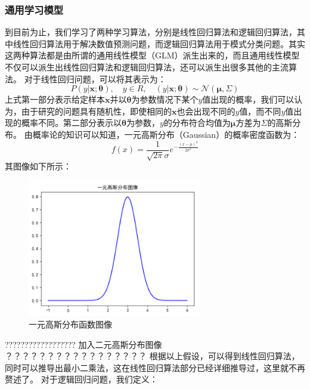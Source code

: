 \documentclass[UTF8]{article}
\begin{document}
\subsubsection{通用学习模型}
到目前为止，我们学习了两种学习算法，分别是线性回归算法和逻辑回归算法，其中线性回归算法用于解决数值预测问题，而逻辑回归算法用于模式分类问题。其实这两种算法都是由所谓的通用线性模型（GLM）派生出来的，而且通用线性模型不仅可以派生出线性回归算法和逻辑回归算法，还可以派生出很多其他的主流算法。\newline
对于线性回归问题，可以将其表示为：
\begin{equation}
P(y \vert \boldsymbol{x}; \boldsymbol{\theta}), \quad y \in R, \quad (y \vert \boldsymbol{x}; \boldsymbol{\theta}) \sim \mathcal{N}(\boldsymbol{\mu}, \Sigma)
\label{lcrn-linear-regression-def}
\end{equation}
上式第一部分表示给定样本$\boldsymbol{x}$并以$\boldsymbol{\theta}$为参数情况下某个$y$值出现的概率，我们可以认为，由于研究的问题具有随机性，即使相同的$\boldsymbol{x}$也会出现不同的$y$值，而不同$y$值出现的概率不同。第二部分表示以$\boldsymbol{\theta}$为参数，$y$的分布符合均值为$\boldsymbol{\mu}$方差为$\Sigma$的高斯分布。\newline
由概率论的知识可以知道，一元高斯分布（Gaussian）的概率密度函数为：
\begin{equation}
f(x)=\frac{1}{\sqrt{2\pi}\sigma}e^{ -\frac{(x-\mu)^{2}}{2\sigma ^{2}} }
\label{lcrn-gaussian-uni-def}
\end{equation}
其图像如下所示：
\begin{figure}[H]
	\caption{一元高斯分布函数图像}
	\label{f000026}
	\centering
	\includegraphics[height=6cm]{images/f000026}
\end{figure}
?????????????????? 加入二元高斯分布图像 ？？？？？？？？？？？？？？？？？
根据以上假设，可以得到线性回归算法，同时可以推导出最小二乘法，这在线性回归算法部分已经详细推导过，这里就不再赘述了。\newline
对于逻辑回归问题，我们定义：
\end{document}
